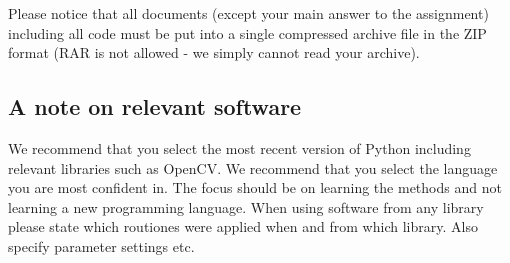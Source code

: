 \documentclass[a4paper,12pts]{article}
\begin{document}
Please notice that all documents (except your main answer to the
assignment) including all code must be put into a single compressed
archive file in the ZIP format (RAR is not allowed - we simply cannot
read your archive). 

 

\subsection*{A note on relevant software}
We recommend that you select the most recent version of Python
including relevant libraries such as OpenCV. We recommend that you
select the language you are most confident in. The focus should be on
learning the methods and not learning a new programming language. When
using software from any library please state which routiones were
applied when and from which library. Also specify parameter settings etc.
\end{document}
